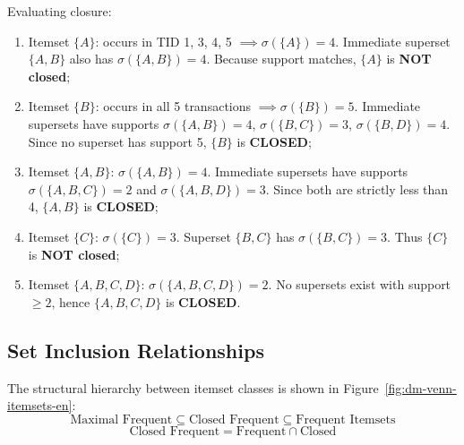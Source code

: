 Evaluating closure:
\begin{enumerate}
    \item Itemset $\{A\}$: occurs in TID 1, 3, 4, 5 $\implies \sigma(\{A\}) = 4$. Immediate superset $\{A, B\}$ also has $\sigma(\{A, B\}) = 4$. Because support matches, $\{A\}$ is \textbf{NOT closed};
    \item Itemset $\{B\}$: occurs in all 5 transactions $\implies \sigma(\{B\}) = 5$. Immediate supersets have supports $\sigma(\{A, B\}) = 4$, $\sigma(\{B, C\}) = 3$, $\sigma(\{B, D\}) = 4$. Since no superset has support 5, $\{B\}$ is \textbf{CLOSED};
    \item Itemset $\{A, B\}$: $\sigma(\{A, B\}) = 4$. Immediate supersets have supports $\sigma(\{A, B, C\}) = 2$ and $\sigma(\{A, B, D\}) = 3$. Since both are strictly less than 4, $\{A, B\}$ is \textbf{CLOSED};
    \item Itemset $\{C\}$: $\sigma(\{C\}) = 3$. Superset $\{B, C\}$ has $\sigma(\{B, C\}) = 3$. Thus $\{C\}$ is \textbf{NOT closed};
    \item Itemset $\{A, B, C, D\}$: $\sigma(\{A, B, C, D\}) = 2$. No supersets exist with support $\ge 2$, hence $\{A, B, C, D\}$ is \textbf{CLOSED}.
\end{enumerate}

\subsection{Set Inclusion Relationships}
The structural hierarchy between itemset classes is shown in Figure~\ref{fig:dm-venn-itemsets-en}:
\begin{equation}
\label{eq:dm-itemset-hierarchy-en}
\text{Maximal Frequent} \subseteq \text{Closed Frequent} \subseteq \text{Frequent Itemsets}
\end{equation}
\begin{equation}
\text{Closed Frequent} = \text{Frequent} \cap \text{Closed}
\end{equation}

